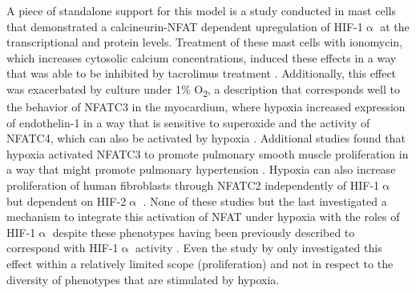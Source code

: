 A piece of standalone support for this model is a study conducted in mast cells that demonstrated a calcineurin\hyp{}NFAT dependent upregulation of HIF\hyp{}1$\upalpha$ at the transcriptional and protein levels. Treatment of these mast cells with ionomycin, which increases cytosolic calcium concentrations, induced these effects in a way that was able to be inhibited by tacrolimus treatment \citep{WalczakDrzewiecka2008}. Additionally, this effect was exacerbated by culture under 1\% O\textsubscript{2}, a description that corresponds well to the behavior of NFATC3 in the myocardium, where hypoxia increased expression of endothelin\hyp{}1 in a way that is sensitive to superoxide and the activity of NFATC4, which can also be activated by hypoxia \citep{deFrutos2011, RamiroDiaz2014, Moreno2015}. Additional studies found that hypoxia activated NFATC3 to promote pulmonary smooth muscle proliferation in a way that might promote pulmonary hypertension \citep{Hou2013}. Hypoxia can also increase proliferation of human fibroblasts through NFATC2 independently of HIF\hyp{}1$\upalpha$ but dependent on HIF\hyp{}2$\upalpha$ \citep{Senavirathna2018}. None of these studies but the last investigated a mechanism to integrate this activation of NFAT under hypoxia with the roles of HIF\hyp{}1$\upalpha$ despite these phenotypes having been previously described to correspond with HIF\hyp{}1$\upalpha$ activity \citep{Thackaberry2002, Li2014, SonanezOrganis2016, Qi2017, Cui2021}. Even the study by \citeauthor{Senavirathna2018} only investigated this effect within a relatively limited scope (proliferation) and not in respect to the diversity of phenotypes that are stimulated by hypoxia.

